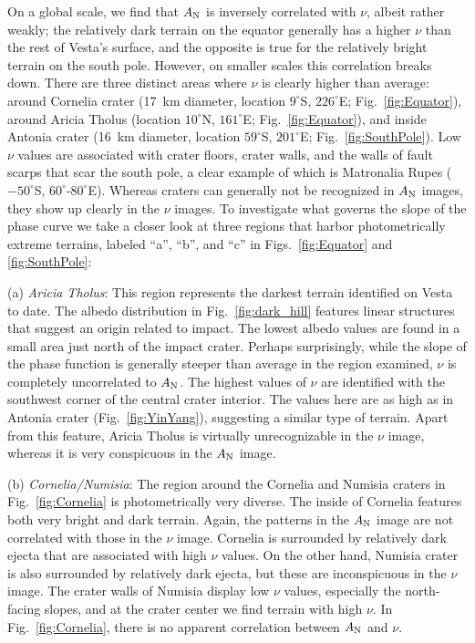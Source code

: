 \documentclass[3p,authoryear]{elsarticle}
\begin{document}
On a global scale, we find that $A_{\rm N}$ is inversely correlated with $\nu$, albeit rather weakly; the relatively dark terrain on the equator generally has a higher $\nu$ than the rest of Vesta's surface, and the opposite is true for the relatively bright terrain on the south pole. However, on smaller scales this correlation breaks down. There are three distinct areas where $\nu$ is clearly higher than average: around Cornelia crater (17~km diameter, location $9^\circ$S, $226^\circ$E; Fig.~\ref{fig:Equator}), around Aricia Tholus (location $10^\circ$N, $161^\circ$E; Fig.~\ref{fig:Equator}), and inside Antonia crater (16~km diameter, location $59^\circ$S, $201^\circ$E; Fig.~\ref{fig:SouthPole}). Low $\nu$ values are associated with crater floors, crater walls, and the walls of fault scarps that scar the south pole, a clear example of which is Matronalia Rupes ($-50^\circ$S, $60^\circ$-$80^\circ$E). Whereas craters can generally not be recognized in $A_{\rm N}$ images, they show up clearly in the $\nu$ images. To investigate what governs the slope of the phase curve we take a closer look at three regions that harbor photometrically extreme terrains, labeled ``a'', ``b'', and ``c'' in Figs.~\ref{fig:Equator} and \ref{fig:SouthPole}:

(a) {\it Aricia Tholus}: This region represents the darkest terrain identified on Vesta to date. The albedo distribution in Fig.~\ref{fig:dark_hill} features linear structures that suggest an origin related to impact. The lowest albedo values are found in a small area just north of the impact crater. Perhaps surprisingly, while the slope of the phase function is generally steeper than average in the region examined, $\nu$ is completely uncorrelated to $A_{\rm N}$. The highest values of $\nu$ are identified with the southwest corner of the central crater interior. The values here are as high as in Antonia crater (Fig.~\ref{fig:YinYang}), suggesting a similar type of terrain. Apart from this feature, Aricia Tholus is virtually unrecognizable in the $\nu$ image, whereas it is very conspicuous in the $A_{\rm N}$ image.

(b) {\it Cornelia/Numisia}: The region around the Cornelia and Numisia craters in Fig.~\ref{fig:Cornelia} is photometrically very diverse. The inside of Cornelia features both very bright and dark terrain. Again, the patterns in the $A_{\rm N}$ image are not correlated with those in the $\nu$ image. Cornelia is surrounded by relatively dark ejecta that are associated with high $\nu$ values. On the other hand, Numisia crater is also surrounded by relatively dark ejecta, but these are inconspicuous in the $\nu$ image. The crater walls of Numisia display low $\nu$ values, especially the north-facing slopes, and at the crater center we find terrain with high $\nu$. In Fig.~\ref{fig:Cornelia}, there is no apparent correlation between $A_{\rm N}$ and $\nu$.
\end{document}
